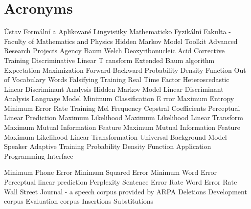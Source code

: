 \chapter{Acronyms}
\label{cha:acronyms}

\begin{acronym}[TDMA]
     {\'{U}stav Form\'{a}ln\'{i} a Aplikovan\'{e} Lingvistiky}
     {Mathematicko Fyzik\'{a}ln\'{i} Fakulta - Faculty of Mathematics and Physics}
     {Hidden Markov Model Toolkit}
     {Advanced Research Projects Agency}
     {Baum Welch}
     {Deoxyribonucleic Acid}
     {Corrective Training}
     {Discriminative Linear T ransform}
     {Extended Baum algorithm}
     {Expectation Maximization}
     {Forward-Backward}
     {Probability Density Function}
     {Out of Vocabulary Words}
     {Falsifying Training}
     {Real Time Factor}
     {Heteroscedastic Linear Discriminant Analysis}
     {Hidden Markov Model}
     {Linear Discriminant Analysis}
     {Language Model}
     {Minimum Classification E rror}
     {Maximum Entropy}
     {Minimum Error Rate Training}
     {Mel Frequency Cepstral Coefficients}
     {Perceptual Linear Prediction}
     {Maximum Likelihood}
     {Maximum Likelihood Linear Transform}
     {Maximum Mutual Information}
     {Feature Maximum Mutual Information}
     {Feature Maximum Likelihood Linear Transformation}
     {Universal Background Model}
     {Speaker Adaptive Training}
     {Probability Density Function}
     {Application Programming Interface}

     {Minimum Phone Error}
     {Minimum Squared Error}
     {Minimum Word Error}
     {Perceptual linear prediction}
     {Perplexity}
     {Sentence Error Rate}
     {Word Error Rate}
     {Wall Street Journal - a speech corpus provided by ARPA}
     {Deletions}
     {Development corpus}
     {Evaluation corpus}
     {Insertions}
     {Substitutions}
\end{acronym}

